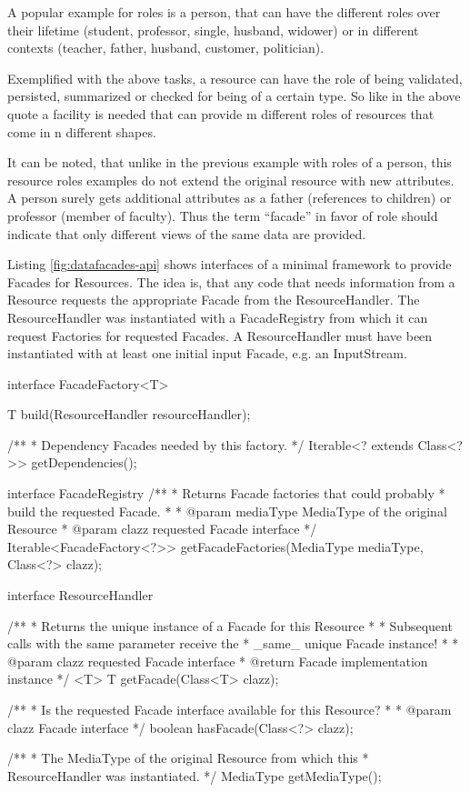 \documentclass[12pt,a4paper,twoside]{scrartcl}		%
\begin{document}
A popular example for roles is a person, that can have the different roles over
their lifetime (student, professor, single, husband, widower) or in different
contexts (teacher, father, husband, customer, politician).


Exemplified with the above tasks, a resource can have the role of being
validated, persisted, summarized or checked for being of a certain type. So like
in the above quote a facility is needed that can provide m different roles of
resources that come in n different shapes.

It can be noted, that unlike in the previous example with roles of a person,
this resource roles examples do not extend the original resource with new
attributes. A person surely gets additional attributes as a father (references
to children) or professor (member of faculty). Thus the term ``facade'' in favor
of role should indicate that only different views of the same data are provided.

Listing \ref{fig:datafacades-api} shows interfaces of a minimal framework to
provide Facades for Resources. The idea is, that any code that needs information
from a Resource requests the appropriate Facade from the ResourceHandler. The
ResourceHandler was instantiated with a FacadeRegistry from which it can request
Factories for requested Facades. A ResourceHandler must have been instantiated
with at least one initial input Facade, e.g. an InputStream.

\begin{javalisting}[label=fig:datafacades-api,
                    float=p,
                   caption={API of the ResourceFacades component}]
interface FacadeFactory<T> {
 T build(ResourceHandler resourceHandler);

 /**
  * Dependency Facades needed by this factory.
  */
 Iterable<? extends Class<?>> getDependencies();
}

interface FacadeRegistry {
 /**
  * Returns Facade factories that could probably
  * build the requested Facade.
  *
  * @param mediaType MediaType of the original Resource
  * @param clazz requested Facade interface
  */
 Iterable<FacadeFactory<?>> getFacadeFactories(MediaType mediaType,
                                               Class<?> clazz);
}

interface ResourceHandler {
 /**
  * Returns the unique instance of a Facade for this Resource
  *
  * Subsequent calls with the same parameter receive the
  * _same_ unique Facade instance!
  *
  * @param clazz requested Facade interface
  * @return Facade implementation instance
  */
 <T> T getFacade(Class<T> clazz);

 /**
  * Is the requested Facade interface available for this Resource?
  *
  * @param clazz Facade interface
  */
 boolean hasFacade(Class<?> clazz);

 /**
  * The MediaType of the original Resource from which this 
  * ResourceHandler was instantiated.
  */
 MediaType getMediaType();
}
\end{javalisting}
\end{document}
